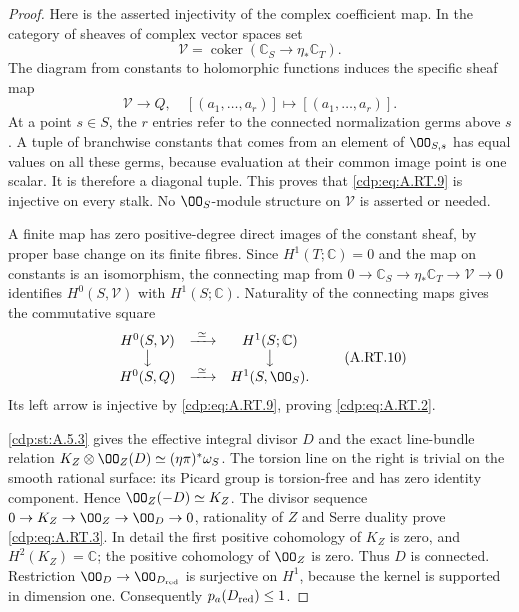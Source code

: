\begin{proof}
Here is the asserted injectivity of the complex coefficient map.
In the category of sheaves of complex vector spaces set
\[
 \mathcal V=\operatorname{coker}
     (\mathbb C_S\longrightarrow\eta_*\mathbb C_T).
\]
The diagram from constants to holomorphic functions induces the
specific sheaf map
\[
 \mathcal V\longrightarrow Q,
 \quad[(a_1,\ldots,a_r)]\longmapsto[(a_1,\ldots,a_r)] .
\tag{A.RT.9}\label{cdp:eq:A.RT.9}
\]
At a point $s\in S$, the $r$ entries refer to the connected
normalization germs above $s$. A tuple of branchwise constants
that comes from an element of $\OO_{S,s}$ has equal values on
all these germs, because evaluation at their common image point
is one scalar. It is therefore a diagonal tuple. This proves
that \eqref{cdp:eq:A.RT.9} is injective on every stalk. No $\OO_S$-module
structure on $\mathcal V$ is asserted or needed.

A finite map has zero positive-degree direct images of the
constant sheaf, by proper base change on its finite fibres.
Since $H^1(T;\mathbb C)=0$ and the map on constants is an
isomorphism, the connecting map from
$0\to\mathbb C_S\to\eta_*\mathbb C_T\to\mathcal V\to0$
identifies $H^0(S,\mathcal V)$ with $H^1(S;\mathbb C)$.
Naturality of the connecting maps gives the commutative square
\[
\begin{array}{ccc}
 H^0(S,\mathcal V)&\xrightarrow{\ \simeq\ }&H^1(S;\mathbb C)\\
 \big\downarrow&&\big\downarrow\\
 H^0(S,Q)&\xrightarrow{\ \simeq\ }&H^1(S,\OO_S).
\end{array}
\tag{A.RT.10}\label{cdp:eq:A.RT.10}
\]
Its left arrow is injective by \eqref{cdp:eq:A.RT.9}, proving \eqref{cdp:eq:A.RT.2}.

\ref{cdp:st:A.5.3} gives the effective integral divisor $D$ and the exact
line-bundle relation
$K_Z\otimes\OO_Z(D)\simeq(\eta\pi)^*\omega_S$.
The torsion line on the right is trivial on the smooth rational
surface: its Picard group is torsion-free and has zero identity
component. Hence $\OO_Z(-D)\simeq K_Z$. The divisor sequence
$0\to K_Z\to\OO_Z\to\OO_D\to0$, rationality of $Z$ and
Serre duality prove \eqref{cdp:eq:A.RT.3}. In detail the first positive
cohomology of $K_Z$ is zero, and $H^2(K_Z)=\mathbb C$;
the positive cohomology of $\OO_Z$ is zero. Thus $D$ is
connected. Restriction $\OO_D\to\OO_{D_{\rm red}}$ is
surjective on $H^1$, because the kernel is supported in
dimension one. Consequently $p_a(D_{\rm red})\le1$.


\end{proof}
